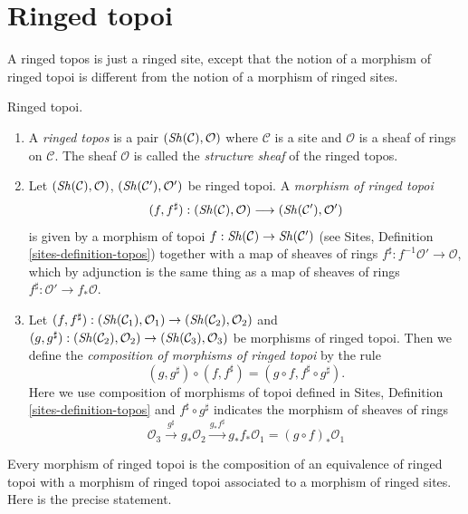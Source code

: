 \section{Ringed topoi}
\label{section-ringed-topoi}

\noindent
A ringed topos is just a ringed site, except that the notion of
a morphism of ringed topoi is different from the notion of a morphism
of ringed sites.

\begin{definition}
\label{definition-ringed-topos}
Ringed topoi.
\begin{enumerate}
\item A {\it ringed topos} is a pair
$(\mathop{\mathit{Sh}}\nolimits(\mathcal{C}), \mathcal{O})$
where $\mathcal{C}$ is a site and $\mathcal{O}$ is a sheaf of rings
on $\mathcal{C}$. The sheaf $\mathcal{O}$ is called the
{\it structure sheaf} of the ringed topos.
\item Let $(\mathop{\mathit{Sh}}\nolimits(\mathcal{C}), \mathcal{O})$,
$(\mathop{\mathit{Sh}}\nolimits(\mathcal{C}'), \mathcal{O}')$ be ringed topoi.
A {\it morphism of ringed topoi}
$$
(f, f^\sharp) :
(\mathop{\mathit{Sh}}\nolimits(\mathcal{C}), \mathcal{O})
\longrightarrow
(\mathop{\mathit{Sh}}\nolimits(\mathcal{C}'), \mathcal{O}')
$$
is given by a morphism of topoi $f : \mathop{\mathit{Sh}}\nolimits(\mathcal{C}) \to \mathop{\mathit{Sh}}\nolimits(\mathcal{C}')$
(see Sites, Definition \ref{sites-definition-topos})
together with a map of sheaves of rings
$f^\sharp : f^{-1}\mathcal{O}' \to \mathcal{O}$, which by adjunction
is the same thing as a map of sheaves of rings
$f^\sharp : \mathcal{O}' \to f_*\mathcal{O}$.
\item Let
$(f, f^\sharp) :
(\mathop{\mathit{Sh}}\nolimits(\mathcal{C}_1), \mathcal{O}_1)
\to (\mathop{\mathit{Sh}}\nolimits(\mathcal{C}_2), \mathcal{O}_2)$ and
$(g, g^\sharp) :
(\mathop{\mathit{Sh}}\nolimits(\mathcal{C}_2), \mathcal{O}_2) \to
(\mathop{\mathit{Sh}}\nolimits(\mathcal{C}_3), \mathcal{O}_3)$
be morphisms of ringed topoi. Then we define
the {\it composition of morphisms of ringed topoi}
by the rule
$$
(g, g^\sharp) \circ (f, f^\sharp) = (g \circ f, f^\sharp \circ g^\sharp).
$$
Here we use composition of morphisms of topoi defined in
Sites, Definition \ref{sites-definition-topos}
and $f^\sharp \circ g^\sharp$ indicates the morphism of sheaves of
rings
$$
\mathcal{O}_3 \xrightarrow{g^\sharp} g_*\mathcal{O}_2
\xrightarrow{g_*f^\sharp} g_*f_*\mathcal{O}_1 = (g \circ f)_*\mathcal{O}_1
$$
\end{enumerate}
\end{definition}

\noindent
Every morphism of ringed topoi is the composition of an equivalence
of ringed topoi with a morphism of ringed topoi associated to a morphism
of ringed sites. Here is the precise statement.

